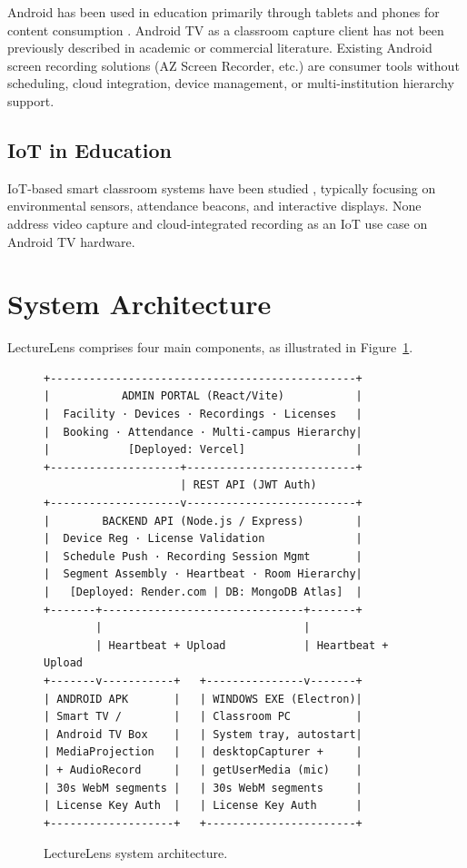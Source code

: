 \documentclass[12pt,a4paper]{article}
\begin{document}
Android has been used in education primarily through tablets and phones for content consumption \cite{androidEdu}. Android TV as a classroom capture client has not been previously described in academic or commercial literature. Existing Android screen recording solutions (AZ Screen Recorder, etc.) are consumer tools without scheduling, cloud integration, device management, or multi-institution hierarchy support.

\subsection{IoT in Education}

IoT-based smart classroom systems have been studied \cite{iotClassroom}, typically focusing on environmental sensors, attendance beacons, and interactive displays. None address video capture and cloud-integrated recording as an IoT use case on Android TV hardware.

\section{System Architecture}

LectureLens comprises four main components, as illustrated in Figure~\ref{fig:arch}.

\begin{figure}[H]
\centering
\begin{lstlisting}
+-----------------------------------------------+
|           ADMIN PORTAL (React/Vite)           |
|  Facility · Devices · Recordings · Licenses   |
|  Booking · Attendance · Multi-campus Hierarchy|
|            [Deployed: Vercel]                 |
+--------------------+--------------------------+
                     | REST API (JWT Auth)
+--------------------v--------------------------+
|        BACKEND API (Node.js / Express)        |
|  Device Reg · License Validation              |
|  Schedule Push · Recording Session Mgmt       |
|  Segment Assembly · Heartbeat · Room Hierarchy|
|   [Deployed: Render.com | DB: MongoDB Atlas]  |
+-------+-------------------------------+-------+
        |                               |
        | Heartbeat + Upload            | Heartbeat + Upload
+-------v-----------+   +---------------v-------+
| ANDROID APK       |   | WINDOWS EXE (Electron)|
| Smart TV /        |   | Classroom PC          |
| Android TV Box    |   | System tray, autostart|
| MediaProjection   |   | desktopCapturer +     |
| + AudioRecord     |   | getUserMedia (mic)    |
| 30s WebM segments |   | 30s WebM segments     |
| License Key Auth  |   | License Key Auth      |
+-------------------+   +-----------------------+
\end{lstlisting}
\caption{LectureLens system architecture.}
\label{fig:arch}
\end{figure}
\end{document}
